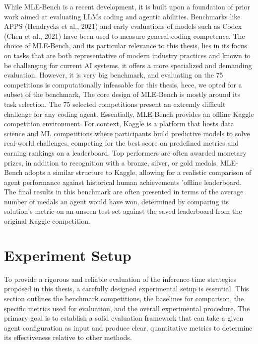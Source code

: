 While MLE-Bench is a recent development, it is built upon a foundation of prior work aimed at evaluating LLMs coding and agentic abilities. Benchmarks like APPS (Hendrycks et al., 2021) and early evaluations of models such as Codex (Chen et al., 2021) have been used to measure general coding competence. The choice of MLE-Bench, and its particular relevance to this thesis, lies in its focus on tasks that are both representative of modern industry practices and known to be challenging for current AI systems, it offers a more specialized and demanding evaluation. However, it is very big benchmark, and evaluating on the 75 competitions is computationally infeasable for this thesis, hece, we opted for a subset of the benchmark,
The core design of MLE-Bench is mostly around its task selection. The 75 selected competitions present an extremly difficult challenge for any coding agent. Essentially, MLE-Bench provides an offline Kaggle competition environment. For context, Kaggle is a platform that hosts data science and ML competitions where participants build predictive models to solve real-world challenges, competing for the best score on predefined metrics and earning rankings on a leaderboard. Top performers are often awarded monetary prizes, in addition to recognition with a bronze, silver, or gold medals. MLE-Bench adopts a similar structure to Kaggle, allowing for a realistic comparison of agent performance against historical human achievements 'offline leaderboard. The final results in this benchmark are often presented in terms of the average number of medals an agent would have won, determined by comparing its solution's metric on an unseen test set against the saved leaderboard from the original Kaggle competition.



\section{Experiment Setup}

To provide a rigorous and reliable evaluation of the inference-time strategies proposed in this thesis, a carefully designed experimental setup is essential. This section outlines the benchmark competitions, the baselines for comparison, the specific metrics used for evaluation, and the overall experimental procedure. The primary goal is to establish a solid evaluation framework that can take a given agent configuration as input and produce clear, quantitative metrics to determine its effectiveness relative to other methods.

